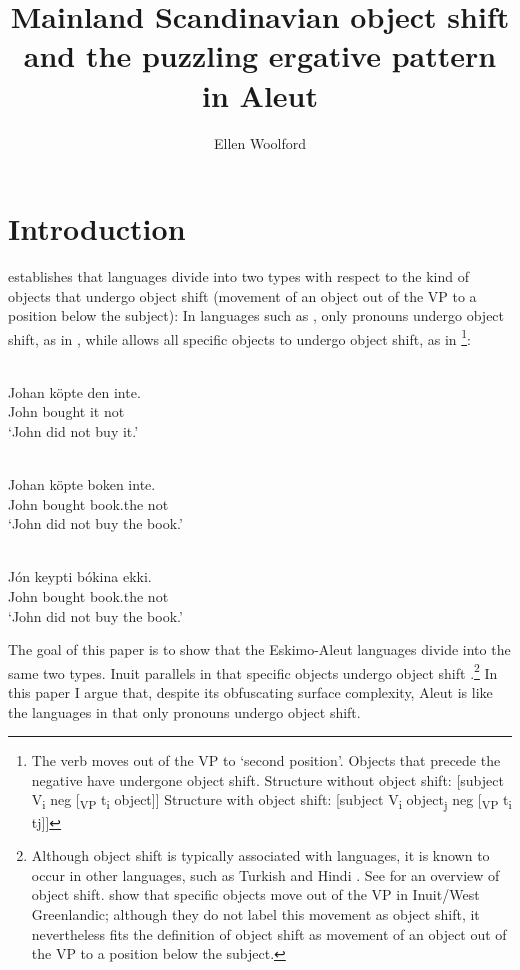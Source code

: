 \documentclass[output=paper]{LSP/langsci}
\author{Ellen Woolford 	\affiliation{University of Massachussetts}
}
\title{Mainland Scandinavian object shift and the puzzling ergative pattern in Aleut}
\begin{document}
\section{Introduction}

\citet{holmberg1986word} establishes that  languages divide into two types with respect to the kind of objects that undergo object shift (movement of an object out of the VP to a position below the subject): In  languages such as , only pronouns undergo object shift, as in , while  allows all specific objects to undergo object shift, as in \footnote{The verb moves out of the VP to ‘second position’. Objects that precede the negative have undergone object shift.
\ea
\ea Structure without object shift:  [subject V\textsubscript{i} neg [\textsubscript{VP} t\textsubscript{i} object]]
\ex Structure with object shift:  [subject V\textsubscript{i} object\textsubscript{j} neg [\textsubscript{VP} t\textsubscript{i} tj]]
\z
\z}:

\ea\label{ex:woolford:1}
\\
\gll Johan  köpte    den  inte. \\
     John  bought   it  not     \\
\glt ‘John did not buy it.’
\z


\ea\label{ex:woolford:2}
\\
\gll *Johan  köpte    boken    inte.\\
       John  bought  book.the  not  \\
\glt  ‘John did not buy the book.’
\z

\ea\label{ex:woolford:3}
\\
\gll Jón  keypti    bókina   ekki.\\
     John  bought  book.the  not  \\
\glt ‘John did not buy the book.’
\z

The goal of this paper is to show that the Eskimo-Aleut languages divide into the same two types. Inuit parallels  in that specific objects undergo object shift \citep{bittner1996ergativity}.\footnote{Although object shift is typically associated with  languages, it is known to occur in other languages, such as Turkish \citep{diesing1996semantic} and Hindi \citep{bhatt1996object}. See \citet{thrainsson2001object} for an overview of object shift. \citet{bittner1996ergativity} show that specific objects move out of the VP in Inuit/West Greenlandic; although they do not label this movement as object shift, it nevertheless fits the definition of object shift as movement of an object out of the VP to a position below the subject.} In this paper I argue that, despite its obfuscating surface complexity, Aleut is like the  languages in that only pronouns undergo object shift.
\end{document}
